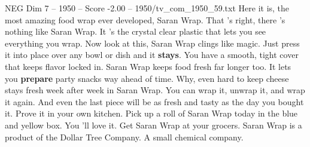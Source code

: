 \begin{textsample}{NEG Dim 7 – 1950 – Score -2.00 – 1950/tv\_com\_1950\_59.txt}  \label{ex:f7_neg_082}
Here it is, the most amazing food wrap ever developed, Saran Wrap.
That 's right, there 's nothing like Saran Wrap.
It 's the crystal clear plastic that lets you see everything you wrap.
Now look at this, Saran Wrap clings like magic.
Just press it into place over any bowl or dish and it \textbf{stays}.
You have a smooth, tight cover that keeps flavor locked in.
Saran Wrap keeps food fresh far longer too.
It lets you \textbf{prepare} party snacks way ahead of time.
Why, even hard to keep cheese stays fresh week after week in Saran Wrap.
You can wrap it, unwrap it, and wrap it again.
And even the last piece will be as fresh and tasty as the day you bought it.
Prove it in your own kitchen.
Pick up a roll of Saran Wrap today in the blue and yellow box.
You 'll love it.
Get Saran Wrap at your grocers.
Saran Wrap is a product of the Dollar Tree Company.
A small chemical company.

\end{textsample}
